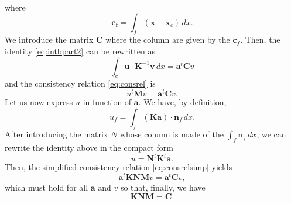 \documentclass[11pt]{amsart}
\newcommand{\vect}[1]{\boldsymbol{#1}}
\newcommand{\mat}[1]{\boldsymbol{#1}}
\begin{document}
where
\begin{equation}
  \label{eq:defcf}
  \vect{c_f} = \int_{f}(\vect{x} - \vect{x}_c)\,dx.
\end{equation}
We introduce the matrix $\mat{C}$ where the column are given by the $\vect{c}_f$. Then, the identity
\eqref{eq:intbpart2} can be rewritten as
\begin{equation}
  \label{eq:intbpart3}
 \int_c\vect{u}\cdot\mat{K}^{-1}\vect{v}\,dx  = \vect{a}^t\mat{C}v
\end{equation}
and the consistency relation \eqref{eq:consrel} is
\begin{equation}
  \label{eq:consrelsimp}
  u^t\mat{M}v = \vect{a}^t\mat{C}v.
\end{equation}
Let us now express $u$ in function of $\vect{a}$. We have, by definition,
\begin{equation*}
  u_f = \int_f (\vect{K}\vect{a})\cdot \vect{n}_f\,dx.
\end{equation*}
After introducing the matrix $N$ whose column is made of the $\int_{f} \vect{n}_f\,dx$, we can
rewrite the identity above in the compact form
\begin{equation}
  \label{eq:relau}
  u = \mat{N}^t\mat{K}^{t}\vect{a}.
\end{equation}
Then, the simplified consistency relation \eqref{eq:consrelsimp} yields
\begin{equation*}
  \vect{a}^t\mat{K}\mat{N}\mat{M}v = \vect{a}^t\mat{C}v,
\end{equation*}
which must hold for all $\vect{a}$ and $v$ so that, finally, we have
\begin{equation}
  \label{eq:consrelfin}
  \mat{K}\mat{N}\mat{M} = \mat{C}.
\end{equation}
\printbibliography
\end{document}
